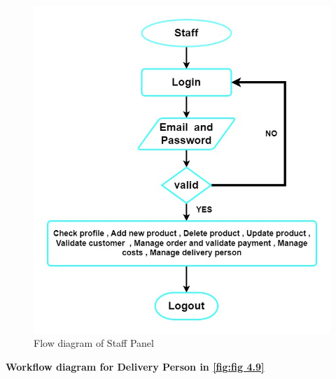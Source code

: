 \begin{figure}[ht]
    \centering  
   \includegraphics[width=\linewidth, height=0.7\textheight]{update_diagram/staff flow diagram.jpg}  
    \caption{Flow diagram of Staff Panel}
    \label{fig:fig 4.8}
\end{figure}

\newpage
\textbf{Workflow diagram for Delivery Person in \ref{fig:fig 4.9}}\\


